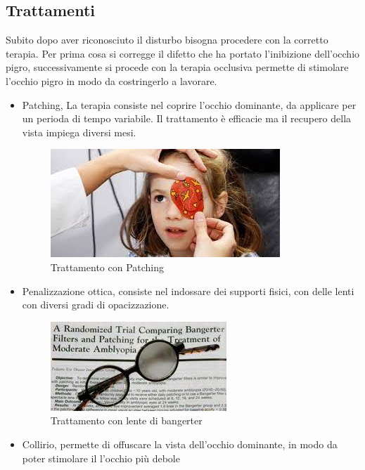 \documentclass[10pt,a4paper]{article}
\begin{document}
	\subsection{Trattamenti}
	Subito dopo aver riconosciuto il disturbo bisogna procedere con la corretto terapia. Per prima cosa si corregge il difetto che ha portato l'inibizione dell'occhio pigro, successivamente si procede con la terapia occlusiva permette di stimolare l'occhio pigro in modo da costringerlo a lavorare.
	\begin{itemize}
		\item Patching, La terapia consiste nel coprire l'occhio dominante, da applicare per un perioda di tempo variabile.
		Il trattamento è efficacie ma il recupero della vista impiega diversi mesi.       	   
			\begin{figure}[!h]
				\centering
				\includegraphics[width=0.7\linewidth]{image/patching}
				\caption{Trattamento con Patching}
				\label{fig:patching}
			\end{figure}	
	
		\item Penalizzazione ottica, consiste nel indossare dei supporti fisici, con delle lenti con diversi gradi di opacizzazione.
		
			\begin{figure}[h]
				\centering
				\includegraphics[width=0.7\linewidth]{image/penalizzazione ottica}
				\caption{Trattamento con lente di bangerter}
				\label{fig:penalizzazione-ottica}
			\end{figure}
    	\newpage
		\item Collirio, permette di offuscare la vista dell'occhio dominante, in modo da poter stimolare il l'occhio più debole
		

\end{itemize}
\end{document}
